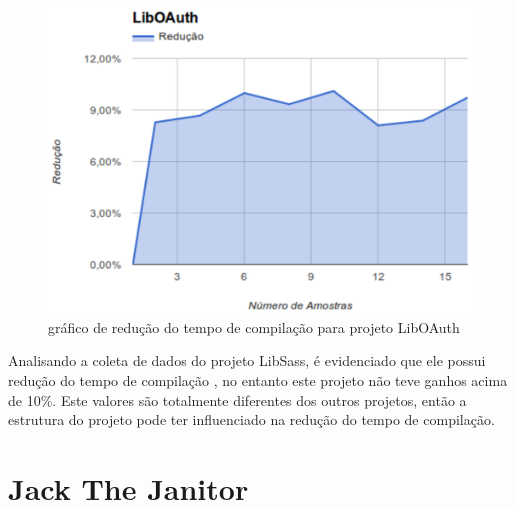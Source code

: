 \begin{figure}[h]
    \centering
        \includegraphics[keepaspectratio=true,scale=1]{figuras/liboauth.eps}
    \caption{gráfico de redução do tempo de compilação para projeto LibOAuth}
    \label{liboauth}
\end{figure}

Analisando a coleta de dados do projeto LibSass, é evidenciado que ele possui
 redução do tempo de compilação , no entanto este projeto não teve ganhos
 acima de 10\%. Este valores são totalmente diferentes dos outros projetos,
 então a estrutura do projeto pode ter influenciado na redução do
 tempo de compilação. 

\section{Jack The Janitor}

